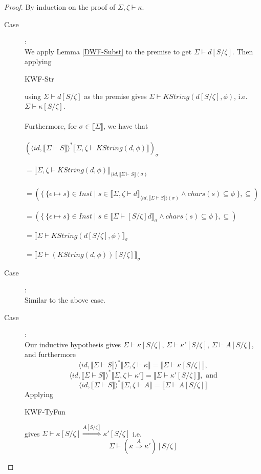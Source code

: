 \documentclass{article}
\newcommand{\sem}[1]{\llbracket #1 \rrbracket}
\begin{document}
\begin{proof}
By induction on the proof of $\Sigma,\zeta \vdash \kappa$. 

\begin{description}
\item[Case ]:~\\
We apply Lemma \ref{DWF-Subst} to the premise to get $\Sigma \vdash d[S/\zeta]$. Then applying 
\begin{sc}KWF-Str\end{sc} using $\Sigma \vdash d[S/\zeta]$ as the premise gives 
$\Sigma \vdash \mathit{KString}(d[S/\zeta],\phi)$, i.e. $\Sigma \vdash \kappa[S/\zeta]$.\\~\\
Furthermore, for $\sigma \in \sem{\Sigma}$, we have that\\~\\
$(\langle \mathit{id}, \sem{\Sigma \vdash S} \rangle^* \sem{\Sigma,\zeta \vdash \mathit{KString(d,\phi)}})_\sigma$\\~\\
$= \sem{\Sigma,\zeta \vdash \mathit{KString(d,\phi)}}_{\langle \mathit{id}, \sem{\Sigma \vdash S}(\sigma)}$\\~\\
$= (\{~\{ \epsilon \mapsto s \} \in \mathit{Inst} \mid s \in \sem{\Sigma,\zeta \vdash d}_{\langle \mathit{id}, \sem{\Sigma \vdash S} \rangle (\sigma)} \wedge \mathit{chars}(s) \subseteq \phi ~\} , \subseteq)$\\~\\
$= (\{~\{ \epsilon \mapsto s \} \in \mathit{Inst} \mid s \in \sem{\Sigma \vdash [S/\zeta]d}_{\sigma} \wedge \mathit{chars}(s) \subseteq \phi ~\} , \subseteq)$\\~\\
$= \sem{\Sigma \vdash \mathit{KString(d[S/\zeta],\phi)}}_\sigma$\\~\\
$= \sem{\Sigma \vdash (\mathit{KString(d,\phi)})[S/\zeta]}_\sigma$

\item[Case ]:~\\
Similar to the above case.

\item[Case ]:~\\
Our inductive hypothesis gives $\Sigma \vdash \kappa[S/\zeta]$, $\Sigma \vdash \kappa'[S/\zeta]$,
$\Sigma \vdash A[S/\zeta]$, and furthermore $$\langle \mathit{id}, \sem{\Sigma \vdash S} \rangle^*\sem{\Sigma,\zeta \vdash \kappa} = \sem{\Sigma \vdash \kappa[S/\zeta]},$$ $$\langle \mathit{id}, \sem{\Sigma \vdash S} \rangle^* \sem{\Sigma,\zeta \vdash \kappa'} = \sem{\Sigma \vdash \kappa'[S/\zeta]}, \text{ and}$$ $$\langle \mathit{id}, \sem{\Sigma \vdash S} \rangle^* \sem{\Sigma,\zeta \vdash A} = \sem{\Sigma \vdash A[S/\zeta]}$$  Applying \begin{sc}KWF-TyFun\end{sc} gives $\Sigma \vdash \kappa[S/\zeta] \overset{A[S/\zeta]}{\Rightarrow} \kappa'[S/\zeta]$ i.e. $$\Sigma \vdash (\kappa \overset{A}{\Rightarrow} \kappa')[S/\zeta]$$


\end{description}
\end{proof}
\end{document}
